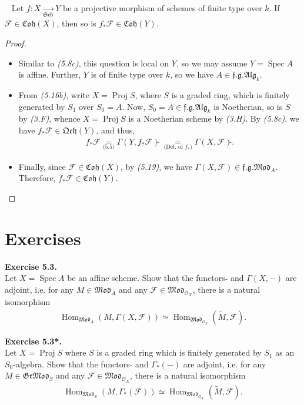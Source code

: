 \documentclass[11pt,a4paper,footinclude=true,headinclude=true]{scrbook} %
\DeclareMathOperator{\Spec}{Spec}
\DeclareMathOperator{\Hom}{Hom}
\DeclareMathOperator{\Proj}{Proj}
\newcommand{\FF}{\mathscr{F}}
\newcommand{\OO}{\mathcal{O}}
\newcommand{\Sch}{\mathfrak{Sch}}
\newcommand{\<}{\langle}
\newcommand{\>}{\rangle}
\newcommand{\GR}{\mathfrak{Gr}}
\newcommand{\fg}{\mathfrak{f.g.}}
\newcommand{\MOD}{\mathfrak{Mod}}
\newcommand{\qcoh}{\mathfrak{Qch}}
\newcommand{\ALG}{\mathfrak{Alg}}
\newcommand{\coh}{\mathfrak{Coh}}
\newenvironment{corollary}[2][]
{\renewcommand\theinnercustomcol{#2}\innercustomcol[#1]
\begin{mdframed}[backgroundcolor=gray!20]\ }
{\end{mdframed}\endinnercustomcol}
\newenvironment{exe}[2][Exercise]
    { \begin{mdframed}[backgroundcolor=gray!20] \textbf{#1 #2.}\\ }
    {  \end{mdframed}}
\begin{document}
\begin{corollary}{5.20}
    Let $f:X\xrightarrow[\Sch]{}Y$ be a projective morphism of schemes of finite type over $k$. If $\FF\in\coh(X)$, then so is $f_\ast\FF\in\coh(Y)$.
\end{corollary}
\begin{proof}\mbox{}
    \begin{itemize}
        \item Similar to \textit{(5.8c)}, this question is local on $Y$, so we may assume $Y=\Spec A$ is affine. Further, $Y$ is of finite type over $k$, so we have $A\in\fg\ALG_k$.
        \item From \textit{(5.16b)}, write $X=\Proj S$, where $S$ is a graded ring, which is finitely generated by $S_1$ over $S_0=A$. Now, $S_0=A\in\fg\ALG_k$ is Noetherian, so is $S$ by \textit{(3.F)}, whence $X=\Proj S$ is a Noetherian scheme by \textit{(3.H)}. By \textit{(5.8c)}, we have $f_\ast\FF\in\qcoh(Y)$, and thus,
        \begin{align*}
            f_\ast\FF\underset{\text{(5.5)}}{=}\Gamma(Y,f_\ast\FF)\widetilde{}\ \underset{\text{(Def. of $f_\ast$)}}{=}\Gamma(X,\FF)\widetilde{}.
        \end{align*}
        \item Finally, since $\FF\in\coh(X)$, by \textit{(5.19)}, we have $\Gamma(X,\FF)\in\fg\MOD_A$. Therefore, $f_\ast\FF\in\coh(Y)$.
    \end{itemize}
\end{proof}

\section*{Exercises}
\begin{exe}{5.3}
    Let $X=\Spec A$ be an affine scheme. Show that the functors $\widetilde{}$ and $\Gamma(X,-)$ are adjoint, i.e. for any $M\in \MOD_A$ and any $\FF\in\MOD_{\OO_X}$, there is a natural isomorphism
    \begin{align*}
        \Hom_{\MOD_A}(M,\Gamma(X,\FF))\simeq\Hom_{\MOD_{\OO_X}}(\widetilde{M},\FF).
    \end{align*}
\end{exe}

\begin{exe}{5.3*}
    Let $X=\Proj S$ where $S$ is a graded ring which is finitely generated by $S_1$ as an $S_0$-algebra. Show that the functors $\widetilde{}$ and $\Gamma_\ast(-)$ are adjoint, i.e. for any $M\in \GR\MOD_S$ and any $\FF\in\MOD_{\OO_X}$, there is a natural isomorphism
    \begin{align*}
        \Hom_{\MOD_S}(M,\Gamma_\ast(\FF))\simeq\Hom_{\MOD_{\OO_X}}(\widetilde{M},\FF).
    \end{align*}
\end{exe}
\end{document}
